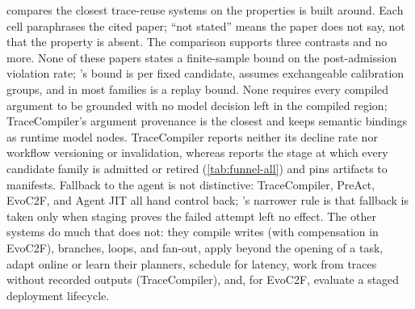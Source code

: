  compares the closest trace-reuse systems on the
properties \method is built around. Each cell paraphrases the cited paper;
``not stated'' means the paper does not say, not that the property is absent.
The comparison supports three contrasts and no more. None of these papers states
a finite-sample bound on the post-admission violation rate; \method's bound is per
fixed candidate, assumes exchangeable calibration groups, and in most families is
a replay bound. None requires every compiled argument to be grounded with no model
decision left in the compiled region; TraceCompiler's argument provenance is the
closest and keeps semantic bindings as runtime model nodes. TraceCompiler reports
neither its decline rate nor workflow versioning or invalidation, whereas \method
reports the stage at which every candidate family is admitted or retired
(\cref{tab:funnel-all}) and pins artifacts to manifests. Fallback to the agent is
not distinctive: TraceCompiler, PreAct, EvoC2F, and Agent JIT all hand control
back; \method's narrower rule is that fallback is taken only when staging proves
the failed attempt left no effect. The other systems do much that \method does
not: they compile writes (with compensation in EvoC2F), branches, loops, and
fan-out, apply beyond the opening of a task, adapt online or learn their planners,
schedule for latency, work from traces without recorded outputs (TraceCompiler),
and, for EvoC2F, evaluate a staged deployment lifecycle.

